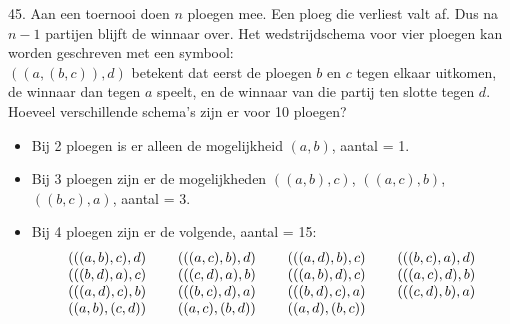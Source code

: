\begin{problem}{45.}
	Aan een toernooi doen $n$ ploegen mee. Een ploeg die verliest valt af. Dus na $n - 1$ partijen blijft de winnaar over. Het wedstrijdschema voor vier ploegen kan worden geschreven met een symbool:\\$((a,(b,c)),d)$ betekent dat eerst de ploegen $b$ en $c$ tegen elkaar uit\-komen, de winnaar dan tegen $a$ speelt, en de winnaar van die partij ten slotte tegen $d$. Hoeveel verschillende schema's zijn er voor 10 ploegen?
	\begin{itemize}
		\item Bij 2 ploegen is er alleen de mogelijkheid $(a,b)$, aantal = 1.
		\item Bij 3 ploegen zijn er de mogelijkheden $((a,b),c)$, $((a,c),b)$, $((b,c),a)$, aantal = 3.
		\item Bij 4 ploegen zijn er de volgende, aantal = 15:
		    \begin{equation*}
	    	\begin{array}{@{}cccc@{}}
	    	(((a,b),c),d) & \quad\;(((a,c),b),d) & \quad\;(((a,d),b),c) & \quad\;(((b,c),a),d) \\
	    	(((b,d),a),c) & \quad\;(((c,d),a),b) & \quad\;(((a,b),d),c) & \quad\;(((a,c),d),b) \\
	    	(((a,d),c),b) & \quad\;(((b,c),d),a) & \quad\;(((b,d),c),a) & \quad\;(((c,d),b),a) \\
	    	((a,b),(c,d)) & \quad\;((a,c),(b,d)) & \quad\;((a,d),(b,c))
	    	\end{array}
	    	\end{equation*}
	\end{itemize}
\end{problem}

